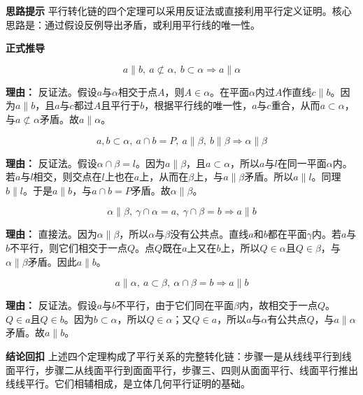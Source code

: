 \begin{proofbox}
	\textbf{\textcolor{CProof}{思路提示}}
	平行转化链的四个定理可以采用反证法或直接利用平行定义证明。核心思路是：通过假设反例导出矛盾，或利用平行线的唯一性。

	\medskip
	\textbf{\textcolor{CProof}{正式推导}}
	\begin{description}[style=nextline, leftmargin=2.8em, labelsep=0.5em, itemsep=0.55em]
		\item[\textbf{步骤一（线面平行判定）：}]
			\[
				a\parallel b,\ a\not\subset\alpha,\ b\subset\alpha \Rightarrow a\parallel\alpha
			\]
			\par\textbf{理由：} 反证法。假设$a$与$\alpha$相交于点$A$，则$A\in\alpha$。在平面$\alpha$内过$A$作直线$c\parallel b$。因为$a\parallel b$，且$a$与$c$都过$A$且平行于$b$，根据平行线的唯一性，$a$与$c$重合，从而$a\subset\alpha$，与$a\not\subset\alpha$矛盾。故$a\parallel\alpha$。
		\item[\textbf{步骤二（面面平行判定）：}]
			\[
				a,b\subset\alpha,\ a\cap b=P,\ a\parallel\beta,\ b\parallel\beta \Rightarrow \alpha\parallel\beta
			\]
			\par\textbf{理由：} 反证法。假设$\alpha\cap\beta=l$。因为$a\parallel\beta$，且$a\subset\alpha$，所以$a$与$l$在同一平面$\alpha$内。若$a$与$l$相交，则交点在$l$上也在$a$上，从而在$\beta$上，与$a\parallel\beta$矛盾。所以$a\parallel l$。同理$b\parallel l$。于是$a\parallel b$，与$a\cap b=P$矛盾。故$\alpha\parallel\beta$。
		\item[\textbf{步骤三（面面平行性质）：}]
			\[
				\alpha\parallel\beta,\ \gamma\cap\alpha=a,\ \gamma\cap\beta=b \Rightarrow a\parallel b
			\]
			\par\textbf{理由：} 直接法。因为$\alpha\parallel\beta$，所以$\alpha$与$\beta$没有公共点。直线$a$和$b$都在平面$\gamma$内。若$a$与$b$不平行，则它们相交于一点$Q$。点$Q$既在$a$上又在$b$上，所以$Q\in\alpha$且$Q\in\beta$，与$\alpha\parallel\beta$矛盾。因此$a\parallel b$。
		\item[\textbf{步骤四（线面平行性质）：}]
			\[
				a\parallel\alpha,\ a\subset\beta,\ \alpha\cap\beta=b \Rightarrow a\parallel b
			\]
			\par\textbf{理由：} 反证法。假设$a$与$b$不平行，由于它们同在平面$\beta$内，故相交于一点$Q$。$Q\in a$且$Q\in b$。因为$b\subset\alpha$，所以$Q\in\alpha$；又$Q\in a$，所以$a$与$\alpha$有公共点$Q$，与$a\parallel\alpha$矛盾。故$a\parallel b$。
	\end{description}

	\medskip
	\textbf{\textcolor{CProof}{结论回扣}}
	上述四个定理构成了平行关系的完整转化链：步骤一是从线线平行到线面平行，步骤二从线面平行到面面平行，步骤三、四则从面面平行、线面平行推出线线平行。它们相辅相成，是立体几何平行证明的基础。
\end{proofbox}

